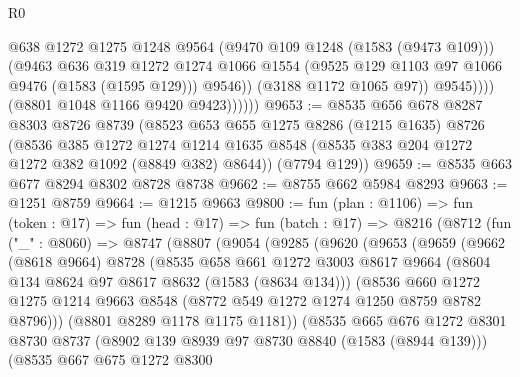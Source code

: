 \begin{lexlean}{R0}
\begin{coremodule}
                          @638
                          @1272
                          @1275
                          @1248
                          @9564
                          (@9470 @109 @1248 (@1583 (@9473 @109)))
                          (@9463
                            @636
                            @319
                            @1272
                            @1274
                            @1066
                            @1554
                            (@9525 @129 @1103 @97 @1066 @9476 (@1583 (@1595 @129)))
                            @9546))
                        (@3188 @1172 @1065 @97))
                      @9545))))
              (@8801 @1048 @1166 @9420 @9423))))))
@9653 := @8535
    @656
    @678
    @8287
    @8303
    @8726
    @8739
    (@8523
      @653
      @655
      @1275
      @8286
      (@1215 @1635)
      @8726
      (@8536
        @385
        @1272
        @1274
        @1214
        @1635
        @8548
        (@8535 @383 @204 @1272 @1272 @382 @1092 (@8849 @382) @8644))
      (@7794 @129))
@9659 := @8535 @663 @677 @8294 @8302 @8728 @8738
@9662 := @8755 @662 @5984 @8293
@9663 := @1251 @8759
@9664 := @1215 @9663
@9800 := fun (plan : @1106) =>
  fun (token : @17) =>
  fun (head : @17) =>
  fun (batch : @17) =>
  @8216
    (@8712
      (fun ("_" : @8060) =>
      @8747
        (@8807
          (@9054
            (@9285
              (@9620
                (@9653
                  (@9659
                    (@9662
                      (@8618 @9664)
                      @8728
                      (@8535
                        @658
                        @661
                        @1272
                        @3003
                        @8617
                        @9664
                        (@8604 @134 @8624 @97 @8617 @8632 (@1583 (@8634 @134)))
                        (@8536
                          @660
                          @1272
                          @1275
                          @1214
                          @9663
                          @8548
                          (@8772 @549 @1272 @1274 @1250 @8759 @8782 @8796)))
                      (@8801 @8289 @1178 @1175 @1181))
                    (@8535
                      @665
                      @676
                      @1272
                      @8301
                      @8730
                      @8737
                      (@8902 @139 @8939 @97 @8730 @8840 (@1583 (@8944 @139)))
                      (@8535
                        @667
                        @675
                        @1272
                        @8300

\end{coremodule}
\end{lexlean}
